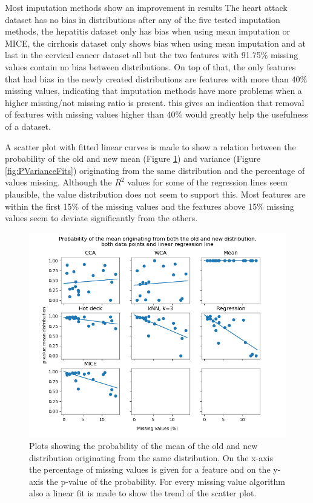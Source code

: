\documentclass[10pt,a4paper]{article}
\begin{document}
\begin{table}[]
\begin{tabular}{l|ll|lll|ll}
		\end{tabular}
	\end{table}

	Most imputation methods show an improvement in results The heart attack dataset has no bias in distributions after any of the five tested imputation methods, the hepatitis dataset only has bias when using mean imputation or MICE, the cirrhosis dataset only shows bias when using mean imputation and at last in the cervical cancer dataset all but the two features with 91.75\% missing values contain no bias between distributions. On top of that, the only features that had bias in the newly created distributions are features with more than 40\% missing values, indicating that imputation methods have more problems when a higher missing/not missing ratio is present. this gives an indication that removal of features with missing values higher than 40\% would greatly help the usefulness of a dataset.
	
	A scatter plot with fitted linear curves is made to show a relation between the probability of the old and new mean (Figure \ref{fig:PMeanFits}) and variance (Figure \ref{fig:PVarianceFits}) originating from the same distribution and the percentage of values missing. Although the $R^2$ values for some of the regression lines seem plausible, the value distribution does not seem to support this. Most features are within the first 15\% of the missing values and the features above 15\% missing values seem to deviate significantly from the others.
	
	\begin{figure}[H]
		\centering
		\includegraphics[width=\textwidth]{Mean_Dist.PNG}
		\caption{Plots showing the probability of the mean of the old and new distribution originating from the same distribution. On the x-axis the percentage of missing values is given for a feature and on the y-axis the p-value of the probability. For every missing value algorithm also a linear fit is made to show the trend of the scatter plot.}
		\label{fig:PMeanFits}
	\end{figure}
	
\end{document}
